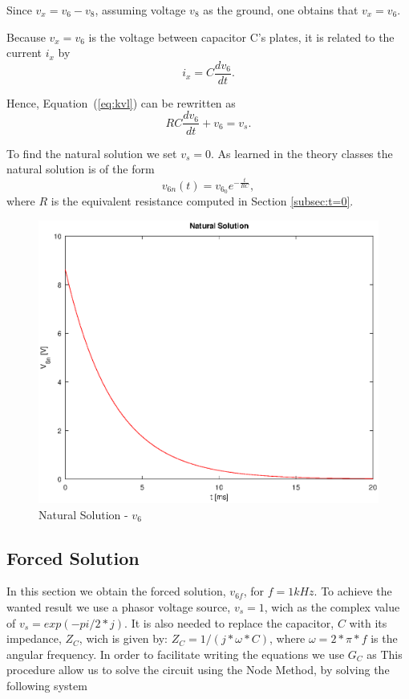 Since $v_{x}=v_{6}-v_{8}$, assuming voltage $v_8$ as the ground, one obtains that $v_{x}=v_{6}$.

Because $v_{x}=v_{6}$ is the voltage between capacitor C's plates, it is related to the
current $i_x$ by
\begin{equation}
  i_{x} = C\frac{dv_6}{dt}.
\end{equation}

Hence, Equation~(\ref{eq:kvl}) can be rewritten as
\begin{equation}
  RC\frac{dv_6}{dt} + v_6 = v_s.
  \label{eq:kvl2}
\end{equation}

To find the natural solution we set $v_{s}=0$.
As learned in the theory classes the natural solution is of the form
\begin{equation}
  v_{6n}(t) = v_{6_0}e^{-\frac{t}{RC}},
  \label{eq:vo_nat}
\end{equation}
where $R$ is the equivalent resistance computed in Section \ref{subsec:t=0}. 


\begin{figure}[H] \centering
  \includegraphics[width=0.8\linewidth]{nat_sol.eps}
  \caption{Natural Solution - $v_6$}
  \label{fig:natural solution}
\end{figure}


\newpage
\subsection{Forced Solution}
\label{subsec:forced_solution}

In this section we obtain the forced solution, $v_{6f}$, for $f=1kHz$.
To achieve the wanted result we use a phasor voltage source, $v_{s}=1$, wich as the complex value of $v_{s}=exp(-pi/2*j)$.
It is also needed to replace the capacitor, $C$ with its impedance, $Z_C$, wich is given by: $Z_{C}= 1/(j*\omega*C)$, where $\omega=2*\pi*f$ is the angular frequency.
In order to facilitate writing the equations we use $G_C$ as %
This procedure allow us to solve the circuit using the Node Method, by solving the following system

